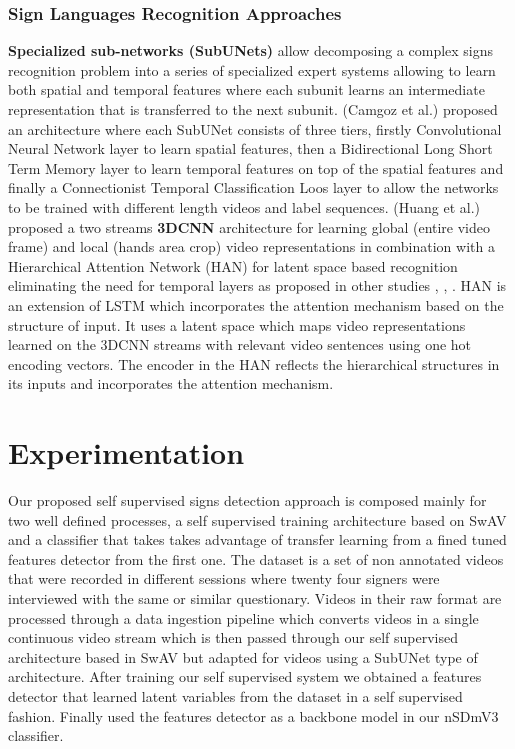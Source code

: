 \documentclass[twocolumn,conference]{article}
\begin{document}
\subsubsection{Sign Languages Recognition Approaches}
\textbf{Specialized sub-networks (SubUNets)} allow decomposing a complex signs recognition problem into a series of specialized expert systems allowing to learn both spatial and temporal features where each subunit learns an intermediate representation that is transferred to the next subunit. (Camgoz et al.) \cite{camgoz2017subunets} proposed an architecture where each SubUNet consists of three tiers, firstly Convolutional Neural Network layer to learn spatial features, then a Bidirectional Long Short Term Memory layer to learn temporal features on top of the spatial features and finally a Connectionist Temporal Classification Loos layer to allow the networks to be trained with different length videos and label sequences. (Huang et al.) \cite{huang2018videobased} proposed a two streams \textbf{3DCNN} architecture for learning global (entire video frame) and local (hands area crop) video representations in combination with a Hierarchical Attention Network (HAN) for latent space based recognition eliminating the need for temporal layers as proposed in other studies \cite{slimane2021context}, \cite{camgoz2017subunets}, \cite{camgoz2020sign}. HAN is an extension of LSTM which incorporates the attention mechanism based on the structure of input. It uses a latent space which maps video representations learned on the 3DCNN streams with relevant video sentences using one hot encoding vectors. The encoder in the HAN reflects the hierarchical structures in its inputs and incorporates the attention mechanism.
\section{Experimentation}\label{experimentation}
Our proposed self supervised signs detection approach is composed mainly for two well defined processes, a self supervised training architecture based on SwAV and a classifier that takes takes advantage of transfer learning from a fined tuned features detector from the first one.  
The dataset is a set of non annotated videos that were recorded in different sessions where twenty four signers were interviewed with the same or similar questionary. Videos in their raw format are processed through a data ingestion pipeline which converts videos in a single continuous video stream which is then passed through our self supervised architecture based in SwAV but adapted for videos using a SubUNet type of architecture. After training our self supervised system we obtained a features detector that learned latent variables from the dataset in a self supervised fashion. Finally used the features detector as a backbone model in our nSDmV3 classifier.
\end{document}
